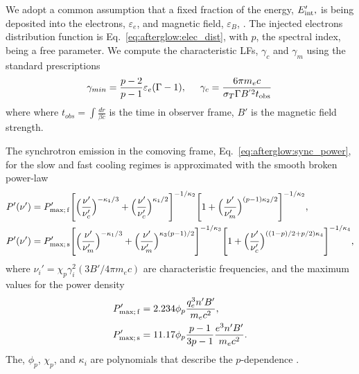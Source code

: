 We adopt a common assumption that a fixed fraction of the \blast{} 
energy, $E'_{\rm int},$ is being
deposited into the electrons, $\varepsilon_e$, and magnetic field, $\varepsilon_B$, 
\citep[\eg][]{Dermer:1997pv}. 
The injected electrons distribution function is Eq.~\eqref{eq:afterglow:elec_dist},
with $p$, the spectral index, being a free parameter.
%
We compute the characteristic \acp{LF}, $\gamma_c$ and $\gamma_m$ using the standard
prescriptions \citep[\eg][]{Dermer:2008ev}
%
\begin{equation}
\label{eq:afterglow:gmin_gc}
\gamma_{min} = \frac{p - 2}{p - 1}  \varepsilon_e (\Gamma - 1) , \hspace{5mm} \gamma_c = \frac{6 \pi m_e c }{\sigma_T \Gamma B^{'2} t_{\rm obs}}\, 
\end{equation}
%
where where $t_{obs} = \int \frac{dr}{\beta c}$ is the time in 
observer frame, $B'$ is the magnetic field strength.

%
The synchrotron emission in the comoving frame, Eq.~\eqref{eq:afterglow:sync_power}, for the slow and fast cooling 
regimes is approximated with the smooth broken power-law 
\citep{Johannesson:2006zs}
%
\begin{equation}
    \begin{aligned}
    P'(\nu') &= P_{\rm max;\, f}' \Bigg[\Big(\frac{\nu'}{\nu_c'}\Big)^{-\kappa_1/3} + \Big(\frac{\nu'}{\nu_c '}\Big)^{\kappa_1/2}\Bigg]^{-1/\kappa_2} \Bigg[1 + \Big(\frac{\nu'}{\nu_m '}\Big)^{(p-1)\kappa_2/2}\Bigg]^{-1/\kappa_2}, \\
    P'(\nu') &= P_{\rm max;\, s}' \Bigg[\Big(\frac{\nu'}{\nu_m'}\Big)^{-\kappa_1/3} + \Big(\frac{\nu'}{\nu_m '}\Big)^{\kappa_3(p-1)/2}\Bigg]^{-1/\kappa_3} \Bigg[1 + \Big(\frac{\nu'}{\nu_c '}\Big)^{((1-p)/2 + p/2)\kappa_4}\Bigg]^{-1/\kappa_4},
    \end{aligned}
\end{equation}
%
where $\nu_i ' = \chi_p \gamma_i^2 (3 B' / 4 \pi m_e c)$ 
are characteristic frequencies, and the 
maximum values for the power density
%
\begin{align}
P' _{\rm max;\, f} &= 2.234 \phi_p \frac{q_e^3 n' B'}{m_e c^2}, \\
P' _{\rm max;\, s} &= 11.17 \phi_p \frac{p-1}{3p-1}\frac{e^3 n' B'}{m_e c^2}.
\end{align}
%
The, $\phi_p$, $\chi_p$, and $\kappa_i$ are polynomials that 
describe the $p$-dependence \citep{Johannesson:2006zs}.

%
%

